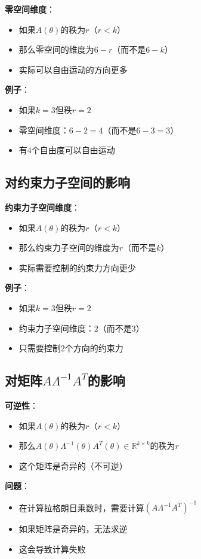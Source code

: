 \documentclass[12pt,a4paper]{article}
\begin{document}
\textbf{零空间维度}：
\begin{itemize}
\item 如果$A(\theta)$的秩为$r$（$r < k$）
\item 那么零空间的维度为$6 - r$（而不是$6 - k$）
\item 实际可以自由运动的方向更多
\end{itemize}

\textbf{例子}：
\begin{itemize}
\item 如果$k = 3$但秩$r = 2$
\item 零空间维度：$6 - 2 = 4$（而不是$6 - 3 = 3$）
\item 有4个自由度可以自由运动
\end{itemize}

\subsection{对约束力子空间的影响}

\textbf{约束力子空间维度}：
\begin{itemize}
\item 如果$A(\theta)$的秩为$r$（$r < k$）
\item 那么约束力子空间的维度为$r$（而不是$k$）
\item 实际需要控制的约束力方向更少
\end{itemize}

\textbf{例子}：
\begin{itemize}
\item 如果$k = 3$但秩$r = 2$
\item 约束力子空间维度：$2$（而不是$3$）
\item 只需要控制2个方向的约束力
\end{itemize}

\subsection{对矩阵$A\Lambda^{-1}A^T$的影响}

\textbf{可逆性}：
\begin{itemize}
\item 如果$A(\theta)$的秩为$r$（$r < k$）
\item 那么$A(\theta)\Lambda^{-1}(\theta)A^T(\theta) \in \mathbb{R}^{k \times k}$的秩为$r$
\item 这个矩阵是奇异的（不可逆）
\end{itemize}

\textbf{问题}：
\begin{itemize}
\item 在计算拉格朗日乘数时，需要计算$(A\Lambda^{-1}A^T)^{-1}$
\item 如果矩阵是奇异的，无法求逆
\item 这会导致计算失败
\end{itemize}
\end{document}
